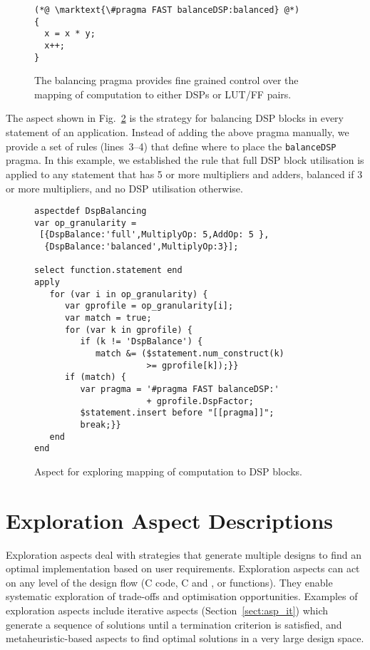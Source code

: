 \lstset{style=MaxC}
\begin{figure}[!h]
\begin{lstlisting}
(*@ \marktext{\#pragma FAST balanceDSP:balanced} @*)
{
  x = x * y;
  x++;
}
\end{lstlisting}
\caption{The \FAST{} balancing pragma provides fine grained control
  over the mapping of computation to either DSPs or LUT/FF pairs.}
\label{fig:aspect-balance}
\end{figure}

The aspect shown in Fig.~\ref{fig:aspect-DSP} is the strategy for
balancing DSP blocks in every statement of an application. Instead of
adding the above pragma manually, we provide a set of rules
(lines~3--4) that define where to place the \texttt{balanceDSP}
pragma. In this example, we established the rule that full DSP block
utilisation is applied to any statement that has 5 or more
multipliers and adders, balanced if 3 or more multipliers, and no DSP
utilisation otherwise.

\lstset{style=lara}
\begin{figure}[!h]
  \centering
  \begin{lstlisting}
aspectdef DspBalancing
var op_granularity =
 [{DspBalance:'full',MultiplyOp: 5,AddOp: 5 },
  {DspBalance:'balanced',MultiplyOp:3}];

select function.statement end
apply
   for (var i in op_granularity) {
      var gprofile = op_granularity[i];
      var match = true;
      for (var k in gprofile) {
         if (k != 'DspBalance') {
            match &= ($statement.num_construct(k)
                      >= gprofile[k]);}}
      if (match) {
         var pragma = '#pragma FAST balanceDSP:'
                      + gprofile.DspFactor;
         $statement.insert before "[[pragma]]";
         break;}}
   end
end
  \end{lstlisting}
  \caption{Aspect for exploring mapping of computation to DSP blocks.}
  \label{fig:aspect-DSP}
\end{figure}




\section{Exploration Aspect Descriptions}

Exploration aspects deal with strategies that generate multiple designs to find an optimal
implementation based on user requirements. Exploration aspects can act
on any level of the design flow (C code, C and \FAST{}, or \FAST{}
functions). They enable systematic exploration of trade-offs and
optimisation opportunities. Examples of exploration aspects include
iterative aspects (Section~\ref{sect:asp_it}) which generate a
sequence of solutions until a termination criterion is satisfied, and
metaheuristic-based aspects to find optimal solutions in a very large
design space.


